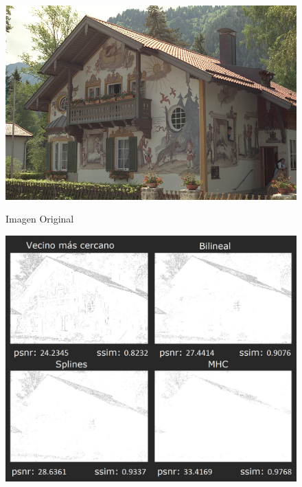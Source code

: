\documentclass[a4paper]{article}
\begin{document}
\newpage

\begin{figure}[h!]
    \caption{Imagen Original}
    \begin{center}
    \includegraphics[scale=0.15]{imagenes/comparacion/12/img12}
    \label{imgOri2}
  \end{center}
\end{figure}

\begin{figure}[h!]
    \caption{}
    \begin{center}
    \includegraphics[scale=0.40]{imagenes/comparacion/12/collage}
    \label{imagen12}
  \end{center}
\end{figure}
\end{document}
